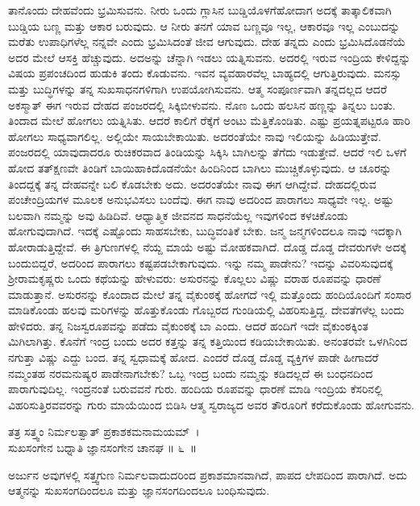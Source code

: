 ತಾನೊಂದು ದೇಹವೆಂದು ಭ್ರಮಿಸುವನು. ನೀರು ಒಂದು ಗ್ಲಾಸಿನ ಬುಡ್ಡಿಯೊಳಗೆ\break ಹೋದಾಗ ಅದಕ್ಕೆ ತಾತ್ಕಾಲಿಕವಾಗಿ ಬುಡ್ಡಿಯ ಬಣ್ಣ ಮತ್ತು ಆಕಾರ ಬರುವುದು. ಆ ನೀರು ತನಗೆ ಯಾವ ಬಣ್ಣವೂ ಇಲ್ಲ, ಆಕಾರವೂ ಇಲ್ಲ ಎಂಬುದನ್ನು ಮರೆತು ಉಪಾಧಿಗಳೆಲ್ಲ ನನ್ನವೇ ಎಂದು ಭ್ರಮಿಸಿದಂತೆ ಜೀವ ಆಗುವುದು. ದೇಹ ತನ್ನದು ಎಂದು ಭ್ರಮಿಸಿದೊಡನೆಯೆ ಅದರ ಮೇಲೆ ಆಸಕ್ತಿ ಹೆಚ್ಚುವುದು. ಅದಅನ್ನು ಚೆನ್ನಾಗಿ ಇಡಲು ಯತ್ನಿಸುವನು. ಅದರಲ್ಲಿ ಇರುವ ಇಂದ್ರಿಯ ಕೇಳಿದ್ದನ್ನು ವಿಷಯ ಪ್ರಪಂಚದಿಂದ ಹುಡುಕಿ ತಂದು ಕೊಡುವನು. ಇವನ ವ್ಯವಹಾರವೆಲ್ಲ ಬಾಹ್ಯದಲ್ಲಿ ಆಗುತ್ತಿರುವುದು. ಮನಸ್ಸು ಮತ್ತು ಬುದ್ಧಿಗಳನ್ನು ತನ್ನ ಸುಖಸಾಧನಗಳಿಗಾಗಿ ಉಪಯೋಗಿಸುವನು. ಆತ್ಮ ಸಂಪೂರ್ಣವಾಗಿ ತನ್ನದಲ್ಲದ ಆದರೆ ಅಕಸ್ಮಾತ್ ಈಗ ಇರುವ ದೇಹದ ಪಂಜರದಲ್ಲಿ ಸಿಕ್ಕಿಬೀಳುವನು. ನೊಣ ಒಂದು ಹಲಸಿನ ಹಣ್ಣನ್ನು ತಿನ್ನಲು ಬಂತು. ತಿಂದಾದ ಮೇಲೆ ಹೋಗಲು ಯತ್ನಿಸಿತು. ಆದರೆ ಕಾಲಿಗೆ ರೆಕ್ಕೆಗೆ ಅಂಟು ಮೆತ್ತಿಕೊಂಡಿತು. ಎಷ್ಟು ಪ್ರಯತ್ನಪಟ್ಟರೂ ಹಾರಿ ಹೋಗಲು ಸಾಧ್ಯವಾಗಲಿಲ್ಲ. ಅಲ್ಲಿಯೇ ಸಾಯಬೇಕಾಯಿತು. ಅದರಂತೆಯೇ ನಾವು ಇಲಿಯನ್ನು ಹಿಡಿಯುತ್ತೇವೆ. ಪಂಜರದಲ್ಲಿ ಯಾವುದಾದರೂ ರುಚಿಕರವಾದ ತಿಂಡಿಯನ್ನು ಸಿಕ್ಕಿಸಿ ಬಾಗಿಲನ್ನು ತೆಗೆದು ಇಡುತ್ತೇವೆ. ಆದರೆ ಇಲಿ ಒಳಗೆ ಹೋದ ತತ್​ಕ್ಷಣವೇ ತಿಂಡಿಗೆ ಬಾಯಿಹಾಕಿದೊಡನೆಯೇ ಹಿಂದಿನಿಂದ ಬಾಗಿಲು ಮುಚ್ಚಿಕೊಳ್ಳುವುದು. ಆ ಚೂರನ್ನು ತಿಂದದ್ದಕ್ಕೆ ತನ್ನ ದೇಹವನ್ನೇ ಬಲಿ ಕೊಡಬೇಕು ಅದು. ಅದರಂತೆಯೇ ನಾವು ಈಗ ಆಗಿದ್ದೇವೆ. ದೇಹದಲ್ಲಿರುವ ಪಂಚೇಂದ್ರಿಯಗಳ ಮೂಲಕ ಅನುಭವಿಸಲು ಬಂದೆವು. ಈಗ ನಾವು ಅದರಿಂದ ಪಾರಾಗಲು ಸಾಧ್ಯವೇ ಇಲ್ಲ. ಅಷ್ಟು ಬಲವಾಗಿ ನಮ್ಮನ್ನು ಅವು ಹಿಡಿದಿವೆ. ಆಧ್ಯಾತ್ಮಿಕ ಜೀವನದ ಸಾಧನೆಯೆಲ್ಲ ಇವುಗಳಿಂದ ಕಳಚಿಕೊಂಡು ಹೋಗುವುದಾಗಿದೆ. ಇದಕ್ಕೆ ಎಷ್ಟೊಂದು ಸಾಹಸಬೇಕು, ಬುದ್ಧಿವಂತಿಕೆ ಬೇಕು. ಜನ್ಮ ಜನ್ಮಗಳಿಂದಲೂ ನಾವು ಇದಕ್ಕಾಗಿ ಹೋರಾಡುತ್ತಿದ್ದೇವೆ. ಈ ತ್ರಿಗುಣಗಳಲ್ಲಿ ನೆಯ್ದ ಮಾಯೆ ಅಷ್ಟು ಮೋಹಕವಾಗಿದೆ. ದೊಡ್ಡ ದೊಡ್ಡ ದೇವರುಗಳೇ ಅದಕ್ಕೆ ಬಂದುಬಿದ್ದರೆ, ಅದರಿಂದ ಪಾರಾಗಲು ಕಷ್ಟಪಡಬೇಕಾಗುವುದು. ಇನ್ನು ನಮ್ಮ ಪಾಡೇನು? ಇದನ್ನು ವಿವರಿಸುವುದಕ್ಕೆ ಶ‍್ರೀರಾಮಕೃಷ್ಣರು ಒಂದು ಕಥೆಯನ್ನು ಹೇಳುವರು: ಅಸುರನನ್ನು ಕೊಲ್ಲಲು ವಿಷ್ಣು ವರಾಹ ರೂಪವನ್ನು ಧಾರಣೆ ಮಾಡುತ್ತಾನೆ. ಅಸುರನನ್ನು ಕೊಂದಾದ ಮೇಲೆ ತನ್ನ ವೈಕುಂಠಕ್ಕೆ ಹೋಗದೆ ಇಲ್ಲಿ ಮತ್ತೊಂದು ಹಂದಿಯೊಂದಿಗೆ ಸಂಸಾರ ಮಾಡಿಕೊಂಡು ಹಲವು ಮರಿಗಳನ್ನು ಹೊತ್ತುಕೊಂಡು ಗೊಬ್ಬರದ ಗುಂಡಿಯಲ್ಲಿ ವಿಹರಿಸುತ್ತಿದ್ದ. ದೇವತೆಗಳೆಲ್ಲ ಬಂದು ಹೇಳಿದರು. ತನ್ನ ನಿಜಸ್ವರೂಪವನ್ನು ಪಡೆದು ವೈಕುಂಠಕ್ಕೆ ಬಾ ಎಂದು. ಆದರೆ ಹಂದಿಗೆ ಇದೇ ವೈಕುಂಠಕ್ಕಿಂತ ಮಿಗಿಲಾಗಿತ್ತು. ಕೊನೆಗೆ ಇಂದ್ರ ಬಂದು ಅದರ ಕತ್ತನ್ನು ತನ್ನ ಕತ್ತಿಯಿಂದ ಕಡಿಯಬೇಕಾಯಿತು. ಅನಂತರವೇ ಒಳಗಿನಿಂದ ನಗುತ್ತಾ ವಿಷ್ಣು ಎದ್ದು ಬಂದ. ತನ್ನ ಸ್ವಧಾಮಕ್ಕೆ ಹೋದ. ಎಂದರೆ ದೊಡ್ಡ ದೊಡ್ಡ ವ್ಯಕ್ತಿಗಳ ಪಾಡೇ ಹೀಗಾದರೆ ನಮ್ಮಂತಹ ನರಮನುಷ್ಯರ ಪಾಡೇನಾಗಬೇಕು? ಒಬ್ಬ ಇಂದ್ರ ಬಂದು ನಮ್ಮನ್ನು ಕಡಿದಲ್ಲದೆ ಈ ಬಂಧನದಿಂದ ಪಾರಾಗುವುದಿಲ್ಲ. ಇಂದ್ರನಂತೆ ಬರುವವನೆ ಗುರು. ಹಂದಿಯ ರೂಪವನ್ನು ಧಾರಣೆ ಮಾಡಿ ಇಂದ್ರಿಯ ಕೆಸರಿನಲ್ಲಿ ವಿಹರಿಸುತ್ತಿರವವರನ್ನು ಗುರು ಮಾಯೆಯಿಂದ ಬಿಡಿಸಿ ಆತ್ಮ ಸ್ವರಾಜ್ಯದ ಅವರ ತೌರೂರಿಗೆ ಕರೆದುಕೊಂಡು ಹೋಗುವನು.

\begin{shloka}
ತತ್ರ ಸತ್ತ್ವಂ ನಿರ್ಮಲತ್ವಾತ್ ಪ್ರಕಾಶಕಮನಾಮಯಮ್~।\\ಸುಖಸಂಗೇನ ಬಧ್ನಾತಿ ಜ್ಞಾನಸಂಗೇನ ಚಾನಘ \hfill॥ ೬~॥
\end{shloka}

\begin{artha}
ಅರ್ಜುನ ಅವುಗಳಲ್ಲಿ ಸತ್ತ್ವಗುಣ ನಿರ್ಮಲವಾದುದರಿಂದ ಪ್ರಕಾಶಮಾನವಾಗಿದೆ, ಪಾಪದ ಲೇಪದಿಂದ ಪಾರಾಗಿದೆ. ಅದು ಆತ್ಮನನ್ನು ಸುಖಸಂಗದಿಂದಲೂ ಮತ್ತು ಜ್ಞಾನಸಂಗದಿಂದಲೂ ಬಂಧಿಸುವುದು.
\end{artha}

